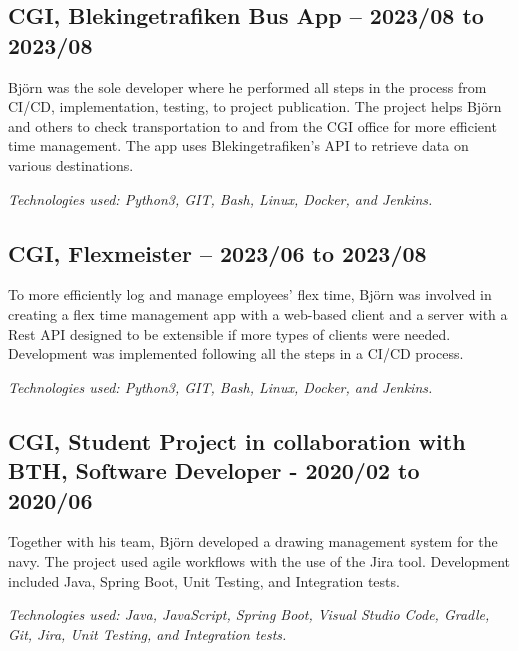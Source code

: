 \documentclass{article}
\begin{document}
\begin{minipage}[t]{0.7\textwidth}
	
	
	\vspace{15pt} %
	\subsection*{\textcolor{colorTitelErfarenhet}{CGI, Blekingetrafiken Bus App – 2023/08 to 2023/08}}
	Björn was the sole developer where he performed all steps in the process from CI/CD, implementation, testing, to project publication. The project helps Björn and others to check transportation to and from the CGI office for more efficient time management. The app uses Blekingetrafiken's API to retrieve data on various destinations.
	
	\vspace{5pt}\textit{Technologies used: Python3, GIT, Bash, Linux, Docker, and Jenkins.}
	
	\vspace{15pt} %
	
	\subsection*{\textcolor{colorTitelErfarenhet}{CGI, Flexmeister – 2023/06 to 2023/08}}
	To more efficiently log and manage employees' flex time, Björn was involved in creating a flex time management app with a web-based client and a server with a Rest API designed to be extensible if more types of clients were needed. Development was implemented following all the steps in a CI/CD process.
	
	\vspace{5pt}\textit{Technologies used: Python3, GIT, Bash, Linux, Docker, and Jenkins.}
	
	\vspace{15pt} %
	\subsection*{\textcolor{colorTitelErfarenhet}{CGI, Student Project in collaboration with BTH, Software Developer - 2020/02 to 2020/06}}
	Together with his team, Björn developed a drawing management system for the navy. The project used agile workflows with the use of the Jira tool. Development included Java, Spring Boot, Unit Testing, and Integration tests.
	
	\vspace{5pt}\textit{Technologies used: Java, JavaScript, Spring Boot, Visual Studio Code, Gradle, Git, Jira, Unit Testing, and Integration tests.} 
	

\end{minipage}
\end{document}
